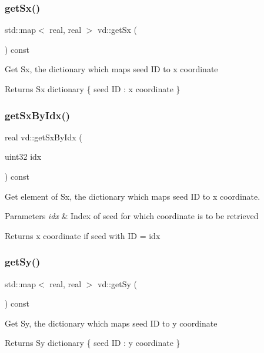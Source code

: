 \subsubsection{\texorpdfstring{get\+Sx()}{getSx()}}
{\footnotesize\ttfamily std\+::map$<$ real, real $>$ vd\+::get\+Sx (\begin{DoxyParamCaption}{ }\end{DoxyParamCaption}) const}

Get Sx, the dictionary which maps seed ID to x coordinate \begin{DoxyReturn}{Returns}
Sx dictionary \{ seed ID \+: x coordinate \} 
\end{DoxyReturn}
\mbox{\label{classvd_a960d4b8fbedb7cbb0686ad42e19d6396}} 
\subsubsection{\texorpdfstring{get\+Sx\+By\+Idx()}{getSxByIdx()}}
{\footnotesize\ttfamily real vd\+::get\+Sx\+By\+Idx (\begin{DoxyParamCaption}\item[{uint32}]{idx }\end{DoxyParamCaption}) const}

Get element of Sx, the dictionary which maps seed ID to x coordinate. 
\begin{DoxyParams}{Parameters}
{\em idx} & Index of seed for which coordinate is to be retrieved \\
\hline
\end{DoxyParams}
\begin{DoxyReturn}{Returns}
x coordinate if seed with ID = idx 
\end{DoxyReturn}
\mbox{\label{classvd_a13a2a103b632b3acf41b925b5b31449e}} 
\subsubsection{\texorpdfstring{get\+Sy()}{getSy()}}
{\footnotesize\ttfamily std\+::map$<$ real, real $>$ vd\+::get\+Sy (\begin{DoxyParamCaption}{ }\end{DoxyParamCaption}) const}

Get Sy, the dictionary which maps seed ID to y coordinate \begin{DoxyReturn}{Returns}
Sy dictionary \{ seed ID \+: y coordinate \} 
\end{DoxyReturn}
\mbox{\label{classvd_a0f630fc80e57d3e17ab036f75afde006}} 
